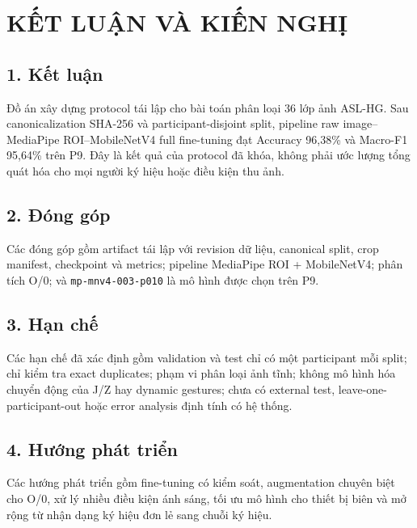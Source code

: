 \chapter*{KẾT LUẬN VÀ KIẾN NGHỊ}

\section*{1. Kết luận}
Đồ án xây dựng protocol tái lập cho bài toán phân loại 36 lớp ảnh ASL-HG. Sau canonicalization SHA-256 và participant-disjoint split, pipeline raw image--MediaPipe ROI--MobileNetV4 full fine-tuning đạt Accuracy 96,38\% và Macro-F1 95,64\% trên P9. Đây là kết quả của protocol đã khóa, không phải ước lượng tổng quát hóa cho mọi người ký hiệu hoặc điều kiện thu ảnh.

\section*{2. Đóng góp}
Các đóng góp gồm artifact tái lập với revision dữ liệu, canonical split, crop manifest, checkpoint và metrics; pipeline MediaPipe ROI + MobileNetV4; phân tích O/0; và \texttt{mp-mnv4-003-p010} là mô hình được chọn trên P9.

\section*{3. Hạn chế}
Các hạn chế đã xác định gồm validation và test chỉ có một participant mỗi split; chỉ kiểm tra exact duplicates; phạm vi phân loại ảnh tĩnh; không mô hình hóa chuyển động của J/Z hay dynamic gestures; chưa có external test, leave-one-participant-out hoặc error analysis định tính có hệ thống.

\section*{4. Hướng phát triển}
Các hướng phát triển gồm fine-tuning có kiểm soát, augmentation chuyên biệt cho O/0, xử lý nhiều điều kiện ánh sáng, tối ưu mô hình cho thiết bị biên và mở rộng từ nhận dạng ký hiệu đơn lẻ sang chuỗi ký hiệu.
